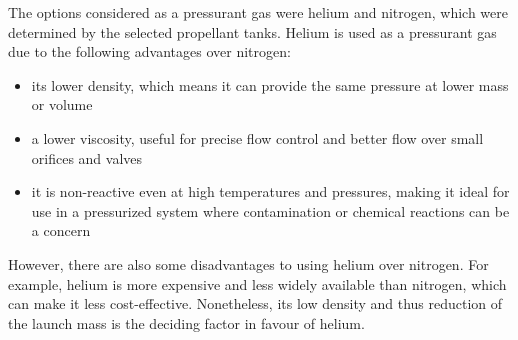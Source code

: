 \documentclass[conference]{IEEEtran}
\begin{document}
The options considered as a pressurant gas were helium and nitrogen, which were determined by the selected propellant tanks. Helium is used as a pressurant gas due to the following advantages over nitrogen: 
\begin{itemize}
    \item its lower density, which means it can provide the same pressure at lower mass or volume 
    \item a lower viscosity, useful for precise flow control and better flow over small orifices and valves
    \item it is non-reactive even at high temperatures and pressures, making it ideal for use in a pressurized system where contamination or chemical reactions can be a concern
\end{itemize}
However, there are also some disadvantages to using helium over nitrogen. For example, helium is more expensive and less widely available than nitrogen, which can make it less cost-effective. Nonetheless, its low density and thus reduction of the launch mass is the deciding factor in favour of helium.
\end{document}
